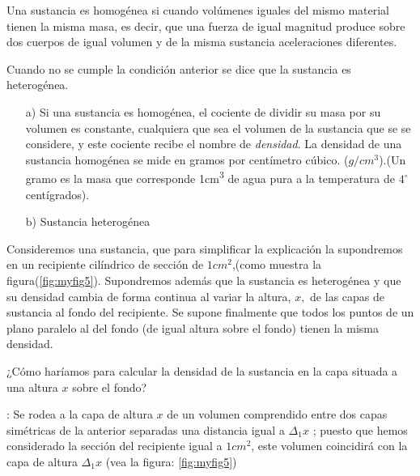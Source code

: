 \begin{solucion}

Una sustancia es homogénea si cuando volúmenes iguales del mismo material
tienen la misma masa, es decir, que una fuerza de igual magnitud produce
sobre dos cuerpos de igual volumen y de la misma sustancia aceleraciones
diferentes.

Cuando no se cumple la condición anterior se dice que la sustancia
es heterogénea.
\begin{enumerate}
\item[a)]  Si una sustancia es homogénea, el cociente de dividir su masa por
su volumen es constante, cualquiera que sea el volumen de la sustancia
que se se considere, y este cociente recibe el nombre de \textsl{densidad}.
La densidad de una sustancia homogénea se mide en gramos por centímetro
cúbico. ($\si{g/cm^3}$).(Un gramo es la masa que corresponde 1\si{cm^3}
de agua pura a la temperatura de $4^{\circ}$ centígrados).
\item[b)]  Sustancia heterogénea 
\end{enumerate}
Consideremos una sustancia, que para simplificar la explicación la
supondremos en un recipiente cilíndrico de sección de $1\si{cm^2}$,(como
muestra la figura(\ref{fig:myfig5}). Supondremos además que la sustancia
es heterogénea y que su densidad cambia de forma continua al variar
la altura, $x,$ de las capas de sustancia al fondo del recipiente.
Se supone finalmente que todos los puntos de un plano paralelo al
del fondo (de igual altura sobre el fondo) tienen la misma densidad.

¿Cómo haríamos para calcular la densidad de la sustancia en la capa
situada a una altura $x$ sobre el fondo?

\vspace*{2pt}\begin{nota}\peque

\emph{}: Se rodea a la capa de altura $x$ de un
volumen comprendido entre dos capas simétricas de la anterior separadas
una distancia igual a $\Delta_{1}x$ ; puesto que hemos considerado
la sección del recipiente igual a $1\si{cm^2}$, este volumen coincidirá
con la capa de altura $\Delta_{1}x$ (vea la figura: \ref{fig:myfig5}) 

\end{nota}\vspace*{2pt} 

\begin{wrapfigure}{r}{0.4\linewidth} \centering


\end{wrapfigure}
\end{solucion}

